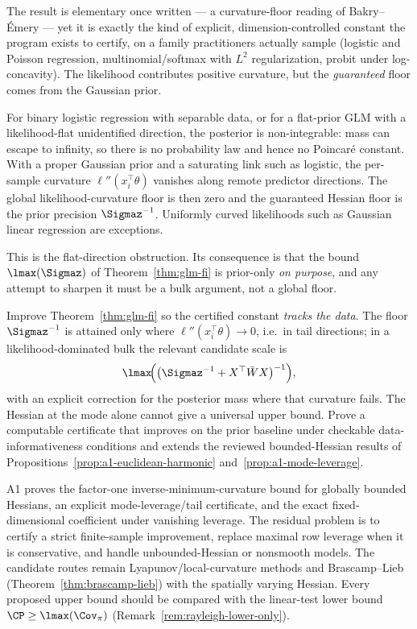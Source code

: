 \documentclass[../main.tex]{subfiles}
\begin{document}
\noindent The result is elementary once written --- a curvature-floor reading of
Bakry--\'Emery --- yet it is exactly the kind of explicit, dimension-controlled constant the
program exists to certify, on a family practitioners actually sample (logistic and Poisson
regression, multinomial/softmax with $L^2$ regularization, probit under log-concavity). The
likelihood contributes positive curvature, but the \emph{guaranteed} floor comes from the
Gaussian prior.

\begin{proposition}
\label{prop:flat-prior-nonintegrable}
For binary logistic regression with separable data, or for a flat-prior GLM with a likelihood-flat
unidentified direction, the posterior is non-integrable: mass can escape to infinity, so there is
no probability law and hence no Poincar\'e constant. With a proper Gaussian prior and a saturating
link such as logistic, the per-sample curvature $\ell''(x_i^\top\theta)$ vanishes along remote
predictor directions. The global likelihood-curvature floor is then zero and the guaranteed
Hessian floor is the prior precision $\Sigmaz^{-1}$. Uniformly curved likelihoods such as Gaussian
linear regression are exceptions.
\end{proposition}

\noindent This is the flat-direction obstruction. Its consequence is that the bound
$\lmax(\Sigmaz)$ of Theorem~\ref{thm:glm-fi} is prior-only \emph{on purpose}, and any attempt
to sharpen it must be a bulk argument, not a global floor.

\begin{question}
\label{q:glm-data-informed}
Improve Theorem~\ref{thm:glm-fi} so the certified constant \emph{tracks the data}. The floor
$\Sigmaz^{-1}$ is attained only where $\ell''(x_i^\top\theta)\to0$, i.e.\ in tail directions;
in a likelihood-dominated bulk the relevant candidate scale is
\[
  \lmax\!\Big(\big(\Sigmaz^{-1}+X^\top\bar W X\big)^{-1}\Big),
\]
with an explicit correction for the posterior mass where that curvature fails. The Hessian at the
mode alone cannot give a universal upper bound. Prove a computable certificate that improves on the
prior baseline under checkable data-informativeness conditions and extends the reviewed
bounded-Hessian results of Propositions~\ref{prop:a1-euclidean-harmonic}
and~\ref{prop:a1-mode-leverage}.
\end{question}

\noindent A1 proves the factor-one inverse-minimum-curvature bound for globally bounded Hessians,
an explicit mode-leverage/tail certificate, and the exact fixed-dimensional coefficient under
vanishing leverage. The residual problem is to certify a strict finite-sample improvement, replace
maximal row leverage when it is conservative, and handle unbounded-Hessian or nonsmooth models.
The candidate routes remain Lyapunov/local-curvature methods
\cite{BakryCattiauxGuillin2008,CattiauxGuillinWangWu2009} and Brascamp--Lieb
(Theorem~\ref{thm:brascamp-lieb}) with the spatially varying Hessian. Every proposed upper bound
should be compared with the linear-test lower bound
$\CP\ge\lmax(\Cov_\pi)$ (Remark~\ref{rem:rayleigh-lower-only}).
\end{document}
